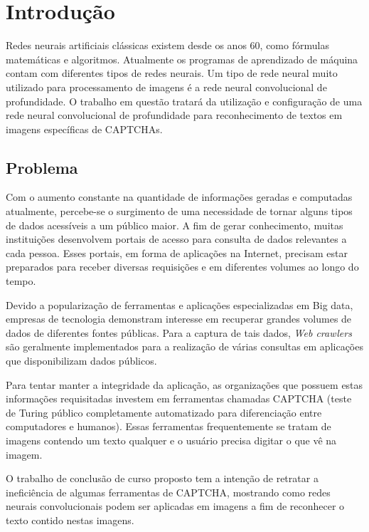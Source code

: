 \chapter{Introdução}

Redes neurais artificiais clássicas existem desde os anos 60, como fórmulas  
matemáticas e algoritmos. Atualmente os programas de aprendizado de máquina  
contam com diferentes tipos de redes neurais. Um tipo de rede neural muito  
utilizado para processamento de imagens é a rede neural convolucional de  
profundidade. O trabalho em questão tratará da utilização e
configuração de uma rede neural convolucional de profundidade para
reconhecimento de textos em imagens específicas de CAPTCHAs.

\section{Problema}

Com o aumento constante na quantidade de informações geradas e 
computadas atualmente, percebe-se o surgimento de uma necessidade de tornar
alguns tipos de dados acessíveis a um público maior. A fim de gerar
conhecimento, muitas instituições desenvolvem portais de acesso para
consulta de dados relevantes a cada pessoa. Esses portais, em forma de
aplicações na Internet, precisam estar preparados para receber
diversas requisições e em diferentes volumes ao longo do tempo.

Devido a popularização de ferramentas e aplicações especializadas em Big
data, empresas de tecnologia demonstram interesse em recuperar grandes
volumes de dados de diferentes fontes públicas. Para a captura de tais
dados, \textit{Web crawlers} são geralmente implementados para a
realização de várias consultas em aplicações que disponibilizam dados
públicos.

Para tentar manter a integridade da aplicação, as organizações que possuem  
estas informações requisitadas investem em ferramentas chamadas CAPTCHA  
(teste de Turing público completamente automatizado para diferenciação entre  
computadores e humanos). Essas ferramentas frequentemente se tratam de  
imagens contendo um texto qualquer e o usuário precisa digitar o que vê na  
imagem. 

O trabalho de conclusão de curso proposto tem a intenção de retratar a  
ineficiência de algumas ferramentas de CAPTCHA, mostrando como redes neurais  
convolucionais podem ser aplicadas em imagens a fim de reconhecer o texto  
contido nestas imagens. 

